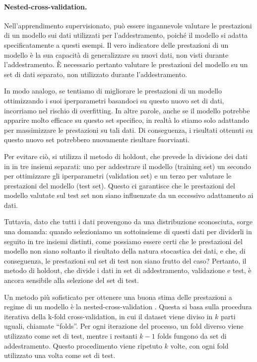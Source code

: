 \paragraph{Nested-cross-validation.} Nell'apprendimento supervisionato, può
essere ingannevole valutare le prestazioni di un modello sui dati utilizzati
per l'addestramento, poiché il modello si adatta specificatamente a questi
esempi. Il vero indicatore delle prestazioni di un modello è la sua capacità
di generalizzare su nuovi dati, non visti durante l'addestramento. È
necessario pertanto valutare le prestazioni del modello su un set di dati
separato, non utilizzato durante l'addestramento.

In modo analogo, se tentiamo di migliorare le prestazioni di un modello
ottimizzando i suoi iperparametri basandoci su questo nuovo set di dati,
incorriamo nel rischio di overfitting. In altre parole, anche se il modello
potrebbe apparire molto efficace su questo set specifico, in realtà lo stiamo
solo adattando per massimizzare le prestazioni su tali dati. Di conseguenza, i
risultati ottenuti su questo nuovo set potrebbero nuovamente risultare
fuorvianti.

Per evitare ciò, si utilizza il metodo di holdout, che prevede la divisione
dei dati in in tre insiemi separati: uno per addestrare il modello (training
set) un secondo per ottimizzare gli iperparametri (validation set) e un terzo
per valutare le prestazioni del modello (test set). Questo ci garantisce che
le prestazioni del modello valutate sul test set non siano influenzate da un
eccessivo adattamento ai dati.

Tuttavia, dato che tutti i dati provengono da una distribuzione sconosciuta,
sorge una domanda: quando selezioniamo un sottoinsieme di questi dati per
dividerli in seguito in tre insiemi distinti, come possiamo essere certi che
le prestazioni del modello non siano soltanto il risultato della natura
stocastica dei dati, e che, di conseguenza, le prestazioni sul set di test non
siano frutto del caso? Pertanto, il metodo di holdout, che divide i dati in
set di addestramento, validazione e test, è ancora sensibile alla selezione
del set di test.

Un metodo più sofisticato per ottenere una buona stima delle prestazioni a
regime di un modello è la nested-cross-validation \cite{cawley2010}. Questa si
basa sulla procedura iterativa della k-fold cross-validation, in cui il
dataset viene diviso in $k$ parti uguali, chiamate ``folds''. Per ogni
iterazione del processo, un fold diverso viene utilizzato come set di test,
mentre i restanti $k-1$ folds fungono da set di addestramento. Questo
procedimento viene ripetuto $k$ volte, con ogni fold utilizzato una volta come
set di test.

